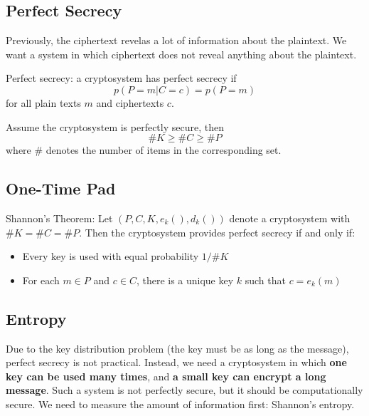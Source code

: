 \subsection{Perfect Secrecy}
Previously, the ciphertext revelas a lot of information about the plaintext. We want a system in which ciphertext does not reveal anything about the plaintext. 

\begin{defn}
    Perfect secrecy: a cryptosystem has perfect secrecy if \[ p(P=m | C=c) = p(P=m) \] for all plain texts $m$ and ciphertexts $c$.
\end{defn}

\begin{lem}
    Assume the cryptosystem is perfectly secure, then 
    \[ \#K \geq \#C \geq \#P\] where $\#$ denotes the number of items in the corresponding set. 
\end{lem}

\subsection{One-Time Pad}

\begin{thm}
    Shannon's Theorem: Let $(P, C, K, e_k(), d_k())$ denote a cryptosystem with \( \#K = \#C = \#P\). Then the cryptosystem provides perfect secrecy if and only if:
    \begin{itemize}
        \item Every key is used with equal probability $1/\#K$
        \item For each $m \in P$ and $c \in C$, there is a unique key $k$ such that $c = e_k(m)$
    \end{itemize}
\end{thm}


\subsection{Entropy}
Due to the key distribution problem (the key must be as long as the message), perfect secrecy is not practical. Instead, we need a cryptosystem in which \textbf{one key can be used many times}, and \textbf{a  small key can encrypt a long message}. Such a system is not perfectly secure, but it should be computationally secure. We need to measure the amount of information first: Shannon's entropy. \\

